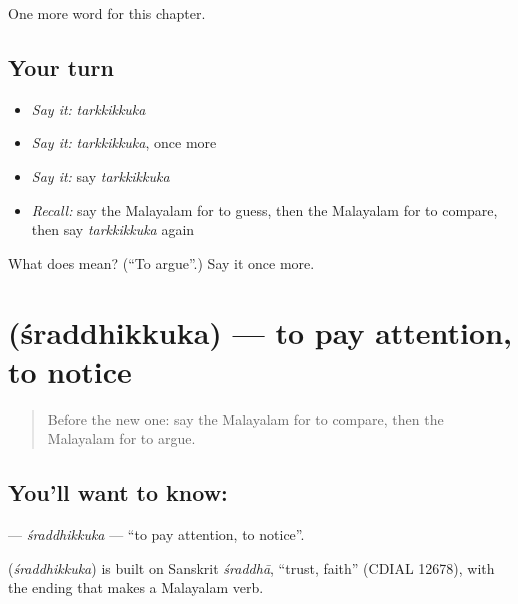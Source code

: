 \begin{grammarlens}[title={What you've built}]
One more word for this chapter.
\end{grammarlens}

\subsection*{Your turn}
\begin{itemize}
\raggedright
  \item \emph{Say it:} \emph{tarkkikkuka}
  \item \emph{Say it:} \emph{tarkkikkuka}, once more
  \item \emph{Say it:} say \emph{tarkkikkuka}
  \item \emph{Recall:} say the Malayalam for to guess, then the Malayalam for to compare, then say \emph{tarkkikkuka} again
\end{itemize}

\begin{tcolorbox}[breakable,colback=teal!4,colframe=teal!35!black,title={Before you move on}]
What does  mean? (\textquotedblleft{}To argue\textquotedblright{}.) Say it once more.
\end{tcolorbox}
\section[\texorpdfstring{\ml{ശ്രദ്ധിക്കുക} (śraddhikkuka)}{ശ്രദ്ധിക്കുക (śraddhikkuka)}]{ (śraddhikkuka) — to pay attention, to notice}

\label{lesson:ML-C270-sraddhikkuka}



\begin{quote}
Before the new one: say the Malayalam for to compare, then the Malayalam for to argue.
\end{quote}

\subsection*{You'll want to know: }
\textbf{} — \emph{śraddhikkuka} — \textquotedblleft{}to pay attention, to notice\textquotedblright{}.

\begin{cousinweb}
\textbf{} (\emph{śraddhikkuka}) is built on Sanskrit \emph{śraddhā}, \textquotedblleft{}trust, faith\textquotedblright{} (CDIAL 12678), with the ending that makes a Malayalam verb.
\end{cousinweb}

